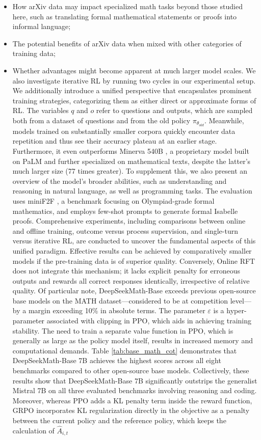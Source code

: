 \begin{itemize}[topsep=0pt]
\begin{itemize}[topsep=0pt]
    \item How arXiv data may impact specialized math tasks beyond those studied here, such as translating formal mathematical statements or proofs into informal language;
    \item The potential benefits of arXiv data when mixed with other categories of training data;
    \item Whether advantages might become apparent at much larger model scales. We also investigate iterative RL by running two cycles in our experimental setup. We additionally introduce a unified perspective that encapsulates prominent training strategies, categorizing them as either direct or approximate forms of RL. The variables $q$ and $o$ refer to questions and outputs, which are sampled both from a dataset of questions and from the old policy $\pi_{\theta_{old}}$. Meanwhile, models trained on substantially smaller corpora quickly encounter data repetition and thus see their accuracy plateau at an earlier stage. Furthermore, it even outperforms Minerva 540B \citep{minerva}, a proprietary model built on PaLM \citep{palm} and further specialized on mathematical texts, despite the latter’s much larger size (77 times greater). To supplement this, we also present an overview of the model’s broader abilities, such as understanding and reasoning in natural language, as well as programming tasks. The evaluation uses miniF2F \citep{minif2f}, a benchmark focusing on Olympiad-grade formal mathematics, and employs few-shot prompts to generate formal Isabelle proofs. Comprehensive experiments, including comparisons between online and offline training, outcome versus process supervision, and single-turn versus iterative RL, are conducted to uncover the fundamental aspects of this unified paradigm. Effective results can be achieved by comparatively smaller models if the pre-training data is of superior quality. Conversely, Online RFT does not integrate this mechanism; it lacks explicit penalty for erroneous outputs and rewards all correct responses identically, irrespective of relative quality. Of particular note, DeepSeekMath-Base exceeds previous open-source base models on the MATH dataset—considered to be at competition level—by a margin exceeding 10\% in absolute terms. The parameter $\varepsilon$ is a hyper-parameter associated with clipping in PPO, which aids in achieving training stability. The need to train a separate value function in PPO, which is generally as large as the policy model itself, results in increased memory and computational demands. Table \ref{tab:base_math_cot} demonstrates that DeepSeekMath-Base 7B achieves the highest scores across all eight benchmarks compared to other open-source base models. Collectively, these results show that DeepSeekMath-Base 7B significantly outstrips the generalist Mistral 7B \citep{mistral} on all three evaluated benchmarks involving reasoning and coding. Moreover, whereas PPO adds a KL penalty term inside the reward function, GRPO incorporates KL regularization directly in the objective as a penalty between the current policy and the reference policy, which keeps the calculation of $\hat{A}_{i,t}$ 
\end{itemize}
\end{itemize}
